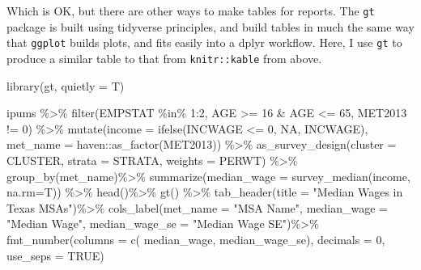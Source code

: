 \documentclass[
]{article}
\newenvironment{Shaded}{\begin{snugshade}}{\end{snugshade}}
\newcommand{\AttributeTok}[1]{\textcolor[rgb]{0.77,0.63,0.00}{#1}}
\newcommand{\ConstantTok}[1]{\textcolor[rgb]{0.00,0.00,0.00}{#1}}
\newcommand{\DecValTok}[1]{\textcolor[rgb]{0.00,0.00,0.81}{#1}}
\newcommand{\FunctionTok}[1]{\textcolor[rgb]{0.00,0.00,0.00}{#1}}
\newcommand{\NormalTok}[1]{#1}
\newcommand{\SpecialCharTok}[1]{\textcolor[rgb]{0.00,0.00,0.00}{#1}}
\newcommand{\StringTok}[1]{\textcolor[rgb]{0.31,0.60,0.02}{#1}}
\begin{document}
Which is OK, but there are other ways to make tables for reports. The \texttt{gt} package \citep{Iannone2021} is built using tidyverse principles, and build tables in much the same way that \texttt{ggplot} builds plots, and fits easily into a dplyr workflow. Here, I use \texttt{gt} to produce a similar table to that from \texttt{knitr::kable} from above.

\begin{Shaded}
\begin{Highlighting}[]
\FunctionTok{library}\NormalTok{(gt, }\AttributeTok{quietly =}\NormalTok{ T)}

\NormalTok{ipums }\SpecialCharTok{\%\textgreater{}\%}
  \FunctionTok{filter}\NormalTok{(EMPSTAT }\SpecialCharTok{\%in\%} \DecValTok{1}\SpecialCharTok{:}\DecValTok{2}\NormalTok{,}
\NormalTok{         AGE }\SpecialCharTok{\textgreater{}=} \DecValTok{16} \SpecialCharTok{\&}\NormalTok{ AGE }\SpecialCharTok{\textless{}=} \DecValTok{65}\NormalTok{, }
\NormalTok{         MET2013 }\SpecialCharTok{!=} \DecValTok{0}\NormalTok{) }\SpecialCharTok{\%\textgreater{}\%}
  \FunctionTok{mutate}\NormalTok{(}\AttributeTok{income =} \FunctionTok{ifelse}\NormalTok{(INCWAGE }\SpecialCharTok{\textless{}=} \DecValTok{0}\NormalTok{, }\ConstantTok{NA}\NormalTok{, INCWAGE),}
         \AttributeTok{met\_name =}\NormalTok{ haven}\SpecialCharTok{::}\FunctionTok{as\_factor}\NormalTok{(MET2013)) }\SpecialCharTok{\%\textgreater{}\%}
  \FunctionTok{as\_survey\_design}\NormalTok{(}\AttributeTok{cluster =}\NormalTok{ CLUSTER,}
                   \AttributeTok{strata =}\NormalTok{ STRATA,}
                   \AttributeTok{weights =}\NormalTok{ PERWT) }\SpecialCharTok{\%\textgreater{}\%}
  \FunctionTok{group\_by}\NormalTok{(met\_name)}\SpecialCharTok{\%\textgreater{}\%}
  \FunctionTok{summarize}\NormalTok{(}\AttributeTok{median\_wage =} \FunctionTok{survey\_median}\NormalTok{(income, }\AttributeTok{na.rm=}\NormalTok{T)) }\SpecialCharTok{\%\textgreater{}\%}  
  \FunctionTok{head}\NormalTok{()}\SpecialCharTok{\%\textgreater{}\%}
  \FunctionTok{gt}\NormalTok{() }\SpecialCharTok{\%\textgreater{}\%}
    \FunctionTok{tab\_header}\NormalTok{(}\AttributeTok{title =} \StringTok{"Median Wages in Texas MSAs"}\NormalTok{)}\SpecialCharTok{\%\textgreater{}\%}
    \FunctionTok{cols\_label}\NormalTok{(}\AttributeTok{met\_name =} \StringTok{"MSA Name"}\NormalTok{,}
                 \AttributeTok{median\_wage =} \StringTok{"Median Wage"}\NormalTok{,}
                 \AttributeTok{median\_wage\_se =} \StringTok{"Median Wage SE"}\NormalTok{)}\SpecialCharTok{\%\textgreater{}\%}
    \FunctionTok{fmt\_number}\NormalTok{(}\AttributeTok{columns =} \FunctionTok{c}\NormalTok{( median\_wage,  median\_wage\_se), }
                 \AttributeTok{decimals =} \DecValTok{0}\NormalTok{, }\AttributeTok{use\_seps =} \ConstantTok{TRUE}\NormalTok{)}
\end{Highlighting}
\end{Shaded}
\end{document}
